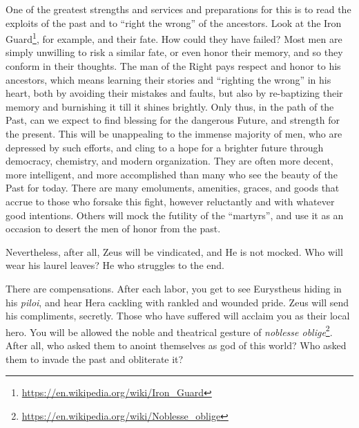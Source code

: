 One of the greatest strengths and services and preparations for this is to read the exploits of the past and to ``right the wrong'' of the ancestors. Look at the Iron Guard\footnote{\url{https://en.wikipedia.org/wiki/Iron\_Guard}}, for example, and their fate. How could they have failed? Most men are simply unwilling to risk a similar fate, or even honor their memory, and so they conform in their thoughts. The man of the Right pays respect and honor to his ancestors, which means learning their stories and ``righting the wrong'' in his heart, both by avoiding their mistakes and faults, but also by re-baptizing their memory and burnishing it till it shines brightly. Only thus, in the path of the Past, can we expect to find blessing for the dangerous Future, and strength for the present. This will be unappealing to the immense majority of men, who are depressed by such efforts, and cling to a hope for a brighter future through democracy, chemistry, and modern organization. They are often more decent, more intelligent, and more accomplished than many who see the beauty of the Past for today. There are many emoluments, amenities, graces, and goods that accrue to those who forsake this fight, however reluctantly and with whatever good intentions. Others will mock the futility of the ``martyrs'', and use it as an occasion to desert the men of honor from the past.

Nevertheless, after all, Zeus will be vindicated, and He is not mocked. Who will wear his laurel leaves? He who struggles to the end.

There are compensations. After each labor, you get to see Eurystheus hiding in his \emph{piloi}, and hear Hera cackling with rankled and wounded pride. Zeus will send his compliments, secretly. Those who have suffered will acclaim you as their local hero. You will be allowed the noble and theatrical gesture of \emph{noblesse oblige}\footnote{\url{https://en.wikipedia.org/wiki/Noblesse\_oblige}}. After all, who asked them to anoint themselves as god of this world? Who asked them to invade the past and obliterate it?

